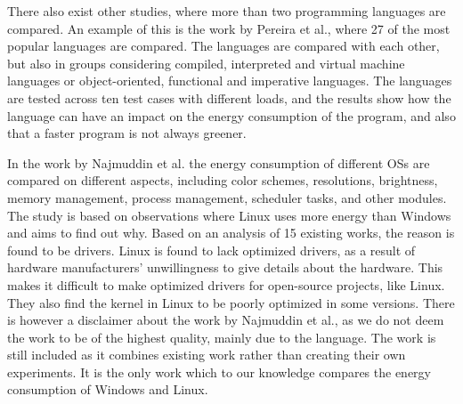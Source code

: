 There also exist other studies, where more than two programming languages are compared. An example of this is the work by Pereira et al.\cite[]{Pereira2017}, where 27 of the most popular languages are compared. The languages are compared with each other, but also in groups considering compiled, interpreted and virtual machine languages or object-oriented, functional and imperative languages. The languages are tested across ten test cases with different loads, and the results show how the language can have an impact on the energy consumption of the program, and also that a faster program is not always greener.\newline

In the work by Najmuddin et al.\cite[]{Najmuddin2021} the energy consumption of different OSs are compared on different aspects, including color schemes, resolutions, brightness, memory management, process management, scheduler tasks, and other modules. The study is based on observations where Linux uses more energy than Windows and aims to find out why. Based on an analysis of 15 existing works, the reason is found to be drivers. Linux is found to lack optimized drivers, as a result of hardware manufacturers' unwillingness to give details about the hardware. This makes it difficult to make optimized drivers for open-source projects, like Linux. They also find the kernel in Linux to be poorly optimized in some versions. There is however a disclaimer about the work by Najmuddin et al.\cite[]{Najmuddin2021}, as we do not deem the work to be of the highest quality, mainly due to the language. The work is still included as it combines existing work rather than creating their own experiments. It is the only work which to our knowledge compares the energy consumption of Windows and Linux.